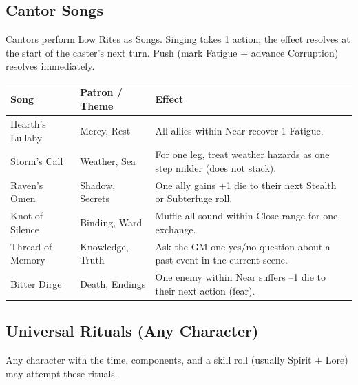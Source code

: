 \subsection{Cantor Songs}

Cantors perform Low Rites as Songs. Singing takes 1 action; the effect resolves at the start of the caster's next turn. Push (mark Fatigue + advance Corruption) resolves immediately.

\begin{tabular}{@{}l>{\raggedright\arraybackslash}p{3cm}>{\raggedright\arraybackslash}p{7cm}@{}}
\toprule
\textbf{Song} & \textbf{Patron / Theme} & \textbf{Effect} \\
\midrule
Hearth's Lullaby & Mercy, Rest & All allies within Near recover 1 Fatigue. \\
Storm's Call & Weather, Sea & For one leg, treat weather hazards as one step milder (does not stack). \\
Raven's Omen & Shadow, Secrets & One ally gains +1 die to their next Stealth or Subterfuge roll. \\
Knot of Silence & Binding, Ward & Muffle all sound within Close range for one exchange. \\
Thread of Memory & Knowledge, Truth & Ask the GM one yes/no question about a past event in the current scene. \\
Bitter Dirge & Death, Endings & One enemy within Near suffers –1 die to their next action (fear). \\
\bottomrule
\end{tabular}

\subsection{Universal Rituals (Any Character)}

Any character with the time, components, and a skill roll (usually Spirit + Lore) may attempt these rituals.

